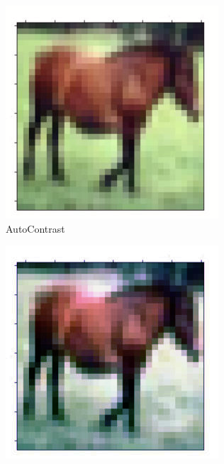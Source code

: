 \documentclass[onecolumn]{ujarticle}   %
\begin{document}
\begin{figure}[h]
      \begin{subfigure}{0.3\columnwidth}
        \centering
        \includegraphics[width=1.0\columnwidth]{transform_test/AutoContrast_0.png}
        \caption{AutoContrast}
        \label{fig:AutoContrast_0}
      \end{subfigure}
      \begin{subfigure}{0.3\columnwidth}
        \centering
        \includegraphics[width=1.0\columnwidth]{transform_test/Equalize_0.png}

\end{subfigure}
\end{figure}
\end{document}
